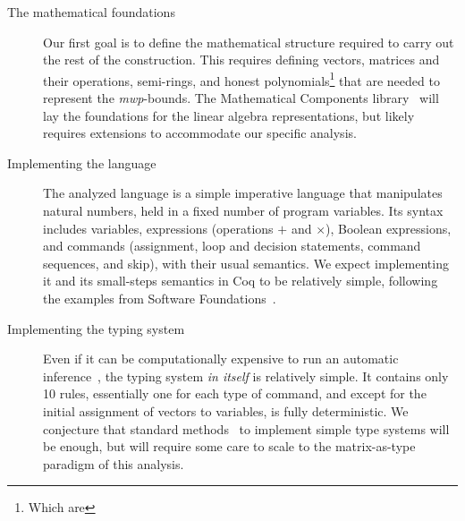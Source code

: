 \begin{description}
    \item[The mathematical foundations]
    Our first goal is to define the mathematical structure required to carry out the rest of the construction.
    This requires defining vectors, matrices and their operations, semi-rings, and honest polynomials\footnote{%
        Which are } that are needed to represent the \emph{mwp}-bounds.
    The Mathematical Components library~\cite{mahboubi2022,mathcomp} will lay the foundations for the linear algebra representations, but likely requires extensions to accommodate our specific analysis.

    \item[Implementing the language]
    The analyzed language is a simple imperative language that manipulates natural numbers, held in a fixed number of program variables.
    Its syntax includes variables, expressions (operations \(+\) and \(\times\)), Boolean expressions, and commands
    (\eg  assignment, loop and decision statements, command sequences, and skip), with their usual semantics.
    We expect implementing it and its small-steps semantics in Coq to be relatively simple, following the examples from Software Foundations~\cite{cpierce20221,cpierce20222}.

    \item[Implementing the typing system]
    Even if it can be computationally expensive to run an automatic inference~\cite{aubert2023b}, the typing system \emph{in itself} is relatively simple.
    It contains only 10 rules, essentially one for each type of command, and except for the initial assignment of vectors to variables, is fully deterministic.
    We conjecture that standard methods~\cite{chlipala2022, chlipala2010} to implement simple type systems will be enough, but will require some care to scale to the matrix-as-type paradigm of this analysis.


\end{description}
